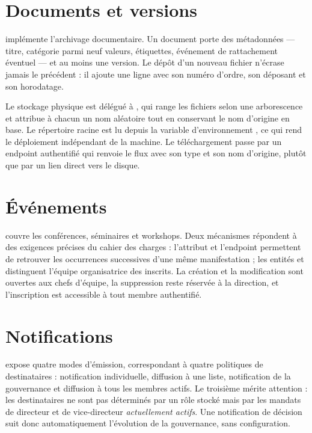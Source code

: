 \section{Documents et versions}

 implémente l'archivage documentaire. Un document porte des
métadonnées --- titre, catégorie parmi neuf valeurs, étiquettes, événement de rattachement
éventuel --- et au moins une version. Le dépôt d'un nouveau fichier n'écrase jamais le
précédent : il ajoute une ligne  avec son numéro d'ordre, son
déposant et son horodatage.

Le stockage physique est délégué à , qui range les fichiers selon
une arborescence  et attribue à chacun un nom aléatoire tout en
conservant le nom d'origine en base. Le répertoire racine est lu depuis la variable
d'environnement , ce qui rend le déploiement indépendant de la
machine. Le téléchargement passe par un endpoint authentifié qui renvoie le flux avec son
type et son nom d'origine, plutôt que par un lien direct vers le disque.

\section{Événements}

 couvre les conférences, séminaires et workshops. Deux mécanismes
répondent à des exigences précises du cahier des charges : l'attribut 
et l'endpoint  permettent de retrouver les occurrences successives
d'une même manifestation ; les entités  et 
distinguent l'équipe organisatrice des inscrits. La création et la modification sont
ouvertes aux chefs d'équipe, la suppression reste réservée à la direction, et l'inscription
est accessible à tout membre authentifié.

\section{Notifications}

 expose quatre modes d'émission, correspondant à quatre
politiques de destinataires : notification individuelle, diffusion à une liste,
notification de la gouvernance et diffusion à tous les membres actifs. Le troisième mérite
attention : les destinataires ne sont pas déterminés par un rôle stocké mais par les
mandats de directeur et de vice-directeur \emph{actuellement actifs}. Une notification de
décision suit donc automatiquement l'évolution de la gouvernance, sans configuration.

